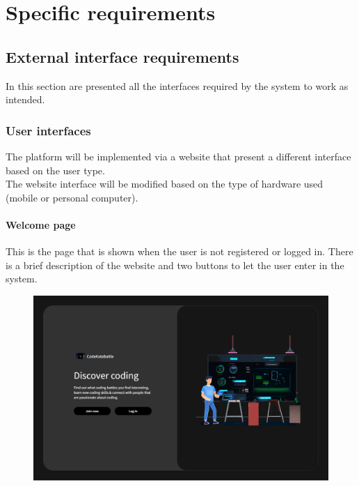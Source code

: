\documentclass[12pt, a4paper]{report}
\begin{document}
\chapter{Specific requirements}
    \section{External interface requirements}
    In this section are presented all the interfaces required by the system to work as intended. 

    \subsection{User interfaces}
    The platform will be implemented via a website that present a different interface based on the user type. \\
    The website interface will be modified based on the type of hardware used (mobile or personal computer). 

    \subsubsection{Welcome page} 
    This is the page that is shown when the user is not registered or logged in. 
    There is a brief description of the website and two buttons to let the user enter in the system. 
    \begin{figure}[H]
        \centering
        \includegraphics[width=0.8\linewidth]{images/welcome.png}
    \end{figure}
\end{document}
